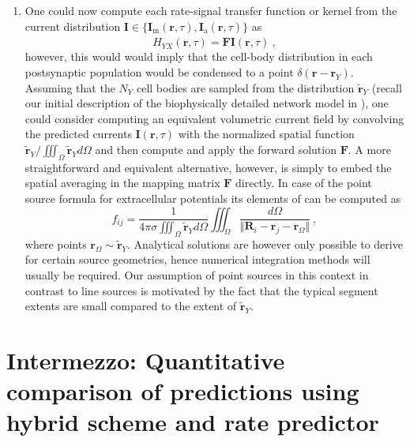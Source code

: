 \begin{enumerate}
\item One could now compute each rate-signal transfer function or kernel from the current distribution
$\mathbf{I} \in \{ \mathbf{I}_\text{m}(\mathbf{r}, \tau), \mathbf{I}_\text{a}(\mathbf{r}, \tau) \}$ as
\begin{equation}
\hat{H}_{YX}(\mathbf{r}, \tau) = \mathbf{F}\mathbf{I}(\mathbf{r}, \tau) ~,
\end{equation}
however, this would would imply that the cell-body distribution in each postsynaptic population would be condensed to a point $\delta(\mathbf{r} - \mathbf{r}_Y)$.
Assuming that the $N_Y$ cell bodies are sampled from the distribution $\widetilde{\mathbf{r}}_Y$
(recall our initial description of the biophysically detailed network model in ),
one could consider computing an equivalent volumetric current field by convolving the predicted currents $\mathbf{I}(\mathbf{r}, \tau)$ with the normalized spatial function
$\widetilde{\mathbf{r}}_Y / \iiint_\Omega \widetilde{\mathbf{r}}_Y d\Omega$
and then compute and apply the forward solution $\mathbf{F}$.
A more straightforward and equivalent alternative, however,
is simply to embed the spatial averaging in the mapping matrix $\mathbf{F}$ directly.
In case of the point source formula for extracellular potentials its elements of can be computed as
\begin{equation}
f_{ij} = \frac{1}{4 \pi \sigma \iiint_\Omega \widetilde{\mathbf{r}}_Y d\Omega}
	\iiint_\Omega \frac{d\Omega}{\Vert \mathbf{R}_i - \mathbf{r}_j - \mathbf{r}_\Omega \Vert}~, 
\end{equation}
where points $\mathbf{r}_\Omega \sim \widetilde{\mathbf{r}}_Y$. 
Analytical solutions are however only possible to derive for certain source geometries, 
hence numerical integration methods will usually be required. 
Our assumption of point sources in this context in contrast to line sources is motivated by the fact that the typical segment extents are small compared to the extent of $\widetilde{\mathbf{r}}_Y$.

\end{enumerate}


\section{Intermezzo: Quantitative comparison of predictions using hybrid scheme and rate predictor}
\label{sec:Schemes:comparison}

